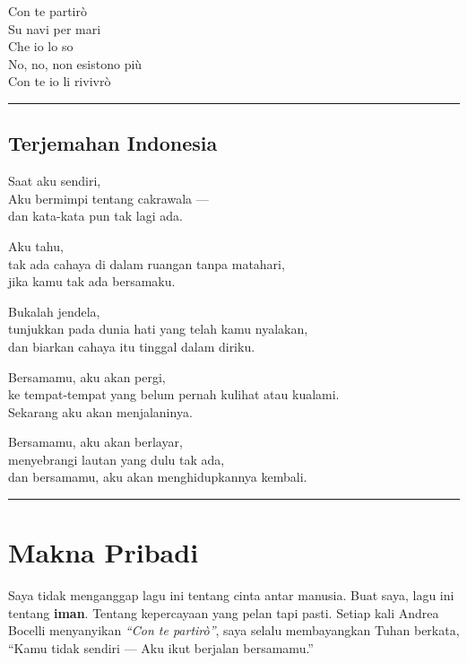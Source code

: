 \documentclass[
  letterpaper,
  DIV=11,
  numbers=noendperiod]{scrreprt}
\begin{document}
Con te partirò\\
Su navi per mari\\
Che io lo so\\
No, no, non esistono più\\
Con te io li rivivrò

\begin{center}\rule{0.5\linewidth}{0.5pt}\end{center}

\subsection{Terjemahan Indonesia}\label{terjemahan-indonesia}

Saat aku sendiri,\\
Aku bermimpi tentang cakrawala ---\\
dan kata-kata pun tak lagi ada.

Aku tahu,\\
tak ada cahaya di dalam ruangan tanpa matahari,\\
jika kamu tak ada bersamaku.

Bukalah jendela,\\
tunjukkan pada dunia hati yang telah kamu nyalakan,\\
dan biarkan cahaya itu tinggal dalam diriku.

Bersamamu, aku akan pergi,\\
ke tempat-tempat yang belum pernah kulihat atau kualami.\\
Sekarang aku akan menjalaninya.

Bersamamu, aku akan berlayar,\\
menyebrangi lautan yang dulu tak ada,\\
dan bersamamu, aku akan menghidupkannya kembali.

\begin{center}\rule{0.5\linewidth}{0.5pt}\end{center}

\section{Makna Pribadi}\label{makna-pribadi}

Saya tidak menganggap lagu ini tentang cinta antar manusia. Buat saya,
lagu ini tentang \textbf{iman}. Tentang kepercayaan yang pelan tapi
pasti. Setiap kali Andrea Bocelli menyanyikan \emph{``Con te partirò''},
saya selalu membayangkan Tuhan berkata, ``Kamu tidak sendiri --- Aku
ikut berjalan bersamamu.''
\end{document}
